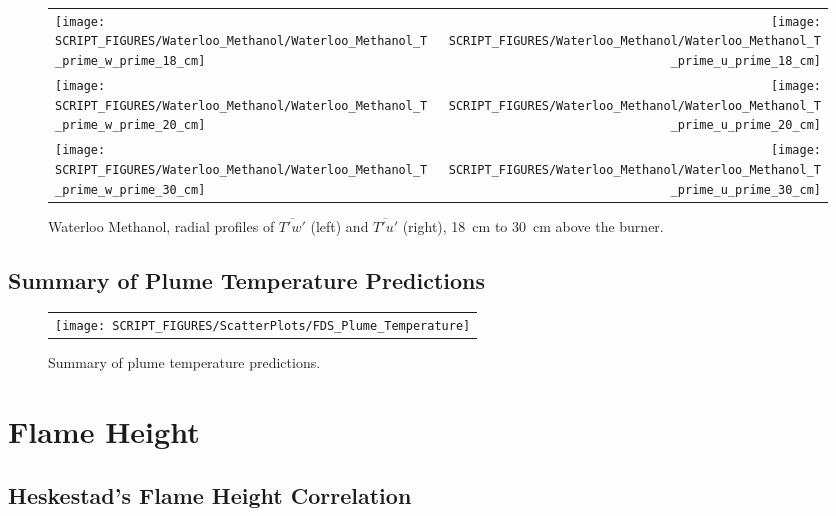\begin{figure}[p]
\begin{tabular*}{\textwidth}{l@{\extracolsep{\fill}}r}
\texttt{[image: SCRIPT\_FIGURES/Waterloo\_Methanol/Waterloo\_Methanol\_T\_prime\_w\_prime\_18\_cm]} &
\texttt{[image: SCRIPT\_FIGURES/Waterloo\_Methanol/Waterloo\_Methanol\_T\_prime\_u\_prime\_18\_cm]} \\
\texttt{[image: SCRIPT\_FIGURES/Waterloo\_Methanol/Waterloo\_Methanol\_T\_prime\_w\_prime\_20\_cm]} &
\texttt{[image: SCRIPT\_FIGURES/Waterloo\_Methanol/Waterloo\_Methanol\_T\_prime\_u\_prime\_20\_cm]} \\
\texttt{[image: SCRIPT\_FIGURES/Waterloo\_Methanol/Waterloo\_Methanol\_T\_prime\_w\_prime\_30\_cm]} &
\texttt{[image: SCRIPT\_FIGURES/Waterloo\_Methanol/Waterloo\_Methanol\_T\_prime\_u\_prime\_30\_cm]}
\end{tabular*}
\caption[Waterloo Methanol, radial profiles of $\overline{T'w'}$ and $\overline{T'u'}$, 18~cm to 30~cm above the burner]
{Waterloo Methanol, radial profiles of $\overline{T'w'}$ (left) and $\overline{T'u'}$ (right), 18~cm to 30~cm above the burner.}
\label{Water_Methanol_Tpwp_3}
\end{figure}


\clearpage


\subsection{Summary of Plume Temperature Predictions}
\label{Plume Temperature}



\begin{figure}[h!]
\begin{center}
\begin{tabular}{c}
\texttt{[image: SCRIPT\_FIGURES/ScatterPlots/FDS\_Plume\_Temperature]}
\end{tabular}
\end{center}
\caption[Summary of plume temperature predictions]
{Summary of plume temperature predictions.}
\label{Plume_Summary}
\end{figure}

\clearpage


\section{Flame Height}

\subsection{Heskestad's Flame Height Correlation}

